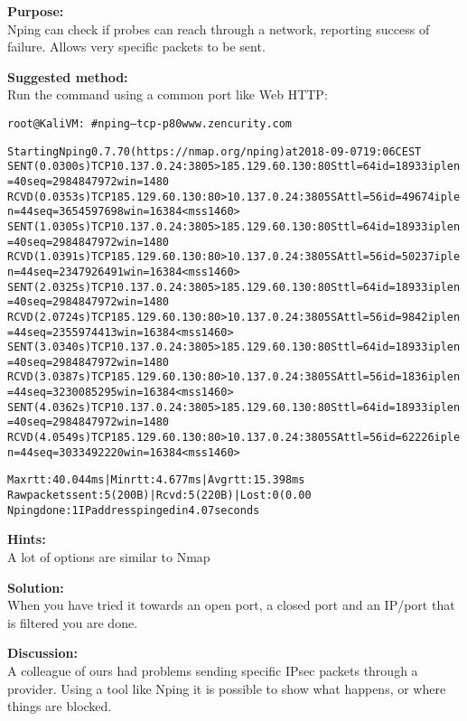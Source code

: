 \documentclass[a4paper,11pt,notitlepage]{report}
\begin{document}
{\bf Purpose:}\\
Nping can check if probes can reach through a network, reporting success of failure. Allows very specific packets to be sent.

{\bf Suggested method:}\\
Run the command using a common port like Web HTTP:
\begin{alltt}\footnotesize
root@KaliVM:~# nping --tcp -p 80 www.zencurity.com

Starting Nping 0.7.70 ( https://nmap.org/nping ) at 2018-09-07 19:06 CEST
SENT (0.0300s) TCP 10.137.0.24:3805 > 185.129.60.130:80 S ttl=64 id=18933 iplen=40  seq=2984847972 win=1480
RCVD (0.0353s) TCP 185.129.60.130:80 > 10.137.0.24:3805 SA ttl=56 id=49674 iplen=44  seq=3654597698 win=16384 <mss 1460>
SENT (1.0305s) TCP 10.137.0.24:3805 > 185.129.60.130:80 S ttl=64 id=18933 iplen=40  seq=2984847972 win=1480
RCVD (1.0391s) TCP 185.129.60.130:80 > 10.137.0.24:3805 SA ttl=56 id=50237 iplen=44  seq=2347926491 win=16384 <mss 1460>
SENT (2.0325s) TCP 10.137.0.24:3805 > 185.129.60.130:80 S ttl=64 id=18933 iplen=40  seq=2984847972 win=1480
RCVD (2.0724s) TCP 185.129.60.130:80 > 10.137.0.24:3805 SA ttl=56 id=9842 iplen=44  seq=2355974413 win=16384 <mss 1460>
SENT (3.0340s) TCP 10.137.0.24:3805 > 185.129.60.130:80 S ttl=64 id=18933 iplen=40  seq=2984847972 win=1480
RCVD (3.0387s) TCP 185.129.60.130:80 > 10.137.0.24:3805 SA ttl=56 id=1836 iplen=44  seq=3230085295 win=16384 <mss 1460>
SENT (4.0362s) TCP 10.137.0.24:3805 > 185.129.60.130:80 S ttl=64 id=18933 iplen=40  seq=2984847972 win=1480
RCVD (4.0549s) TCP 185.129.60.130:80 > 10.137.0.24:3805 SA ttl=56 id=62226 iplen=44  seq=3033492220 win=16384 <mss 1460>

Max rtt: 40.044ms | Min rtt: 4.677ms | Avg rtt: 15.398ms
Raw packets sent: 5 (200B) | Rcvd: 5 (220B) | Lost: 0 (0.00%)
Nping done: 1 IP address pinged in 4.07 seconds
\end{alltt}

{\bf Hints:} \\
A lot of options are similar to Nmap

{\bf Solution:}\\
When you have tried it towards an open port, a closed port and an IP/port that is filtered you are done.

{\bf Discussion:}\\
A colleague of ours had problems sending specific IPsec packets through a provider. Using a tool like Nping it is possible to show what happens, or where things are blocked.
\end{document}
